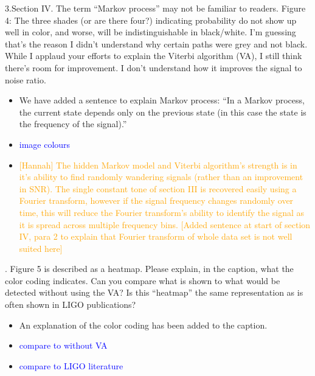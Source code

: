 \documentclass{article}
\newcommand{\todo}{\textcolor{blue}}
\newcommand{\han}{\textcolor{orange}}
\begin{document}
\noindent 3.Section IV.  The term “Markov process” may not be familiar to readers.  Figure 4: The three shades (or are there four?) indicating probability do not show up well in color, and worse, will be indistinguishable in black/white.  I’m guessing that’s the reason I didn’t understand why certain paths were grey and not black.  While I applaud your efforts to explain the Viterbi algorithm (VA), I still think there’s room for improvement.  I don’t understand how it improves the signal to noise ratio. 
\begin{itemize}
\item We have added a sentence to explain Markov process: ``In a Markov process, the current state depends only on the previous state (in this case the state is the frequency of the signal).''
\item \todo{image colours}
\item \han{[Hannah] The hidden Markov model and Viterbi algorithm's strength is in it's ability to find randomly wandering signals (rather than an improvement in SNR). The single constant tone of section III is recovered easily using a Fourier transform, however if the signal frequency changes randomly over time, this will reduce the Fourier transform's ability to identify the signal as it is spread across multiple frequency bins. [Added sentence at start of section IV, para 2 to explain that Fourier transform of whole data set is not well suited here]}
\end{itemize}


. Figure 5 is described as a heatmap.  Please explain, in the caption, what the color coding indicates.  Can you compare what is shown to what would be detected without using the VA?  Is this “heatmap” the same representation as is often shown in LIGO publications?
\begin{itemize}
\item An explanation of the color coding has been added to the caption.
\item \todo{compare to without VA}
\item \todo{compare to LIGO literature}
\end{itemize}
\end{document}

